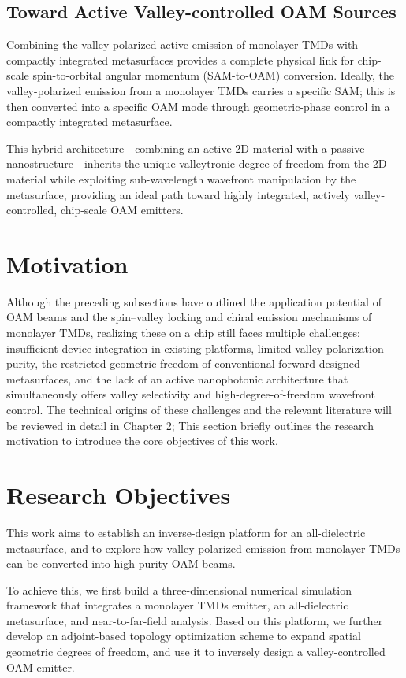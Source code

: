 \subsection{Toward Active Valley-controlled OAM Sources}

Combining the valley-polarized active emission of monolayer TMDs with compactly integrated metasurfaces provides a complete physical link for chip-scale spin-to-orbital angular momentum (SAM-to-OAM) conversion. Ideally, the valley-polarized emission from a monolayer TMDs carries a specific SAM; this is then converted into a specific OAM mode through geometric-phase control in a compactly integrated metasurface.

This hybrid architecture—combining an active 2D material with a passive nanostructure—inherits the unique valleytronic degree of freedom from the 2D material while exploiting sub-wavelength wavefront manipulation by the metasurface, providing an ideal path toward highly integrated, actively valley-controlled, chip-scale OAM emitters.

\section{Motivation}

Although the preceding subsections have outlined the application potential of OAM beams and the spin--valley locking and chiral emission mechanisms of monolayer TMDs, realizing these on a chip still faces multiple challenges: insufficient device integration in existing platforms, limited valley-polarization purity, the restricted geometric freedom of conventional forward-designed metasurfaces, and the lack of an active nanophotonic architecture that simultaneously offers valley selectivity and high-degree-of-freedom wavefront control. The technical origins of these challenges and the relevant literature will be reviewed in detail in Chapter 2; This section briefly outlines the research motivation to introduce the core objectives of this work.

\section{Research Objectives}

This work aims to establish an inverse-design platform for an all-dielectric metasurface, and to explore how valley-polarized emission from monolayer TMDs can be converted into high-purity OAM beams.

To achieve this, we first build a three-dimensional numerical simulation framework that integrates a monolayer TMDs emitter, an all-dielectric metasurface, and near-to-far-field analysis. Based on this platform, we further develop an adjoint-based topology optimization scheme to expand spatial geometric degrees of freedom, and use it to inversely design a valley-controlled OAM emitter.

